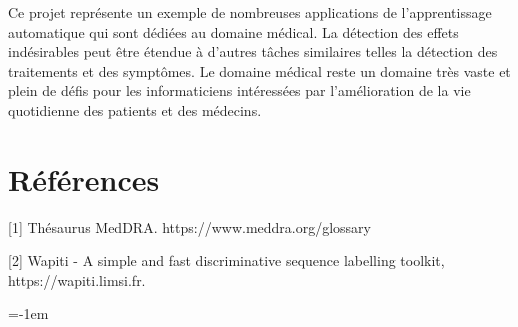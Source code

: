 \documentclass[a4paper,english,11pt]{article}
\makeatletter
\newcommand{\emptypage}[1]{
  \cleardoublepage
  \begingroup
  \let\ps@plain\ps@empty
  \pagestyle{empty}
  #1
  \cleardoublepage
  \endgroup}
\makeatother
\begin{document}
Ce projet représente un exemple de nombreuses applications de l'apprentissage automatique qui sont dédiées au domaine médical. La détection des effets indésirables peut être étendue à d'autres tâches similaires telles la détection des traitements et des symptômes. Le domaine médical reste un domaine très vaste et plein de défis pour les informaticiens intéressées  par l'amélioration de la vie quotidienne des patients et des médecins.

\section*{Références}
[1] Thésaurus MedDRA. https://www.meddra.org/glossary

[2] Wapiti - A simple and fast discriminative sequence labelling toolkit, https://wapiti.limsi.fr.

\parskip=-1em
\let\section\oldsection %
%
\end{document}
